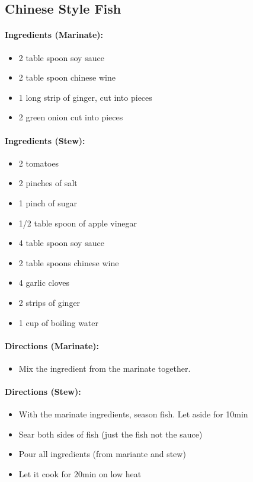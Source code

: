 \documentclass{article}
\begin{document}
\subsection{Chinese Style Fish}

\paragraph{Ingredients (Marinate):}

\begin{itemize}
	\item 2 table spoon soy sauce
	\item 2 table spoon chinese wine
	\item 1 long strip of ginger, cut into pieces
	\item 2 green onion cut into pieces
\end{itemize}

\paragraph{Ingredients (Stew):}

\begin{itemize}
	\item 2 tomatoes
	\item 2 pinches of salt
	\item 1 pinch of sugar
	\item 1/2 table spoon of apple vinegar
	\item 4 table spoon soy sauce
	\item 2 table spoons chinese wine
	\item 4 garlic cloves
	\item 2 strips of ginger
	\item 1 cup of boiling water
\end{itemize}

\paragraph{Directions (Marinate):}
\begin{itemize}
	\item Mix the ingredient from the marinate together.
\end{itemize}


\paragraph{Directions (Stew):}
\begin{itemize}
	\item With the marinate ingredients, season fish. Let aside for 10min
	\item Sear both sides of fish (just the fish not the sauce)
	\item Pour all ingredients (from mariante and stew)
	\item Let it cook for 20min on low heat
\end{itemize}
\end{document}
